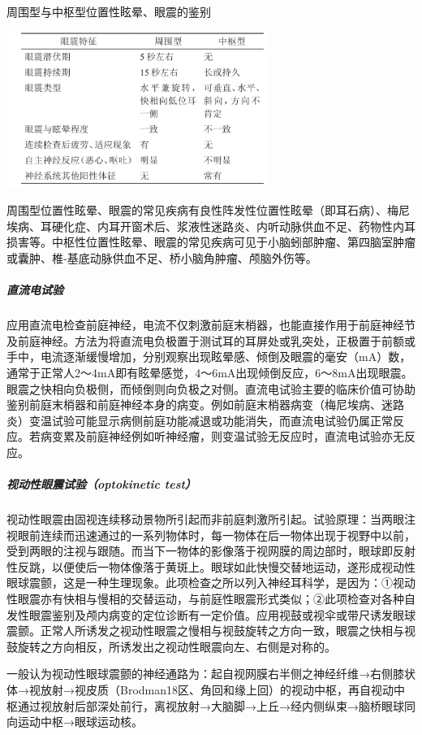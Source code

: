\begin{table}[htbp]
\centering
\caption{周围型与中枢型位置性眩晕、眼震的鉴别}
\label{tab3-1}
\includegraphics[width=3.36458in,height=2in]{./images/Image00008.jpg}
\end{table}

周围型位置性眩晕、眼震的常见疾病有良性阵发性位置性眩晕（即耳石病）、梅尼埃病、耳硬化症、内耳开窗术后、浆液性迷路炎、内听动脉供血不足、药物性内耳损害等。中枢性位置性眩晕、眼震的常见疾病可见于小脑蚓部肿瘤、第四脑室肿瘤或囊肿、椎-基底动脉供血不足、桥小脑角肿瘤、颅脑外伤等。

\subparagraph{直流电试验}

应用直流电检查前庭神经，电流不仅刺激前庭末梢器，也能直接作用于前庭神经节及前庭神经。方法为将直流电负极置于测试耳的耳屏处或乳突处，正极置于前额或手中，电流逐渐缓慢增加，分别观察出现眩晕感、倾倒及眼震的毫安（mA）数，通常于正常人2～4mA即有眩晕感觉，4～6mA出现倾倒反应，6～8mA出现眼震。眼震之快相向负极侧，而倾倒则向负极之对侧。直流电试验主要的临床价值可协助鉴别前庭末梢器和前庭神经本身的病变。例如前庭末梢器病变（梅尼埃病、迷路炎）变温试验可能显示病侧前庭功能减退或功能消失，而直流电试验仍属正常反应。若病变累及前庭神经例如听神经瘤，则变温试验无反应时，直流电试验亦无反应。

\subparagraph{视动性眼震试验（optokinetic test）}

视动性眼震由固视连续移动景物所引起而非前庭刺激所引起。试验原理：当两眼注视眼前连续而迅速通过的一系列物体时，每一物体在后一物体出现于视野中以前，受到两眼的注视与跟随。而当下一物体的影像落于视网膜的周边部时，眼球即反射性反跳，以便使后一物体像落于黄斑上。眼球如此快慢交替地运动，遂形成视动性眼球震颤，这是一种生理现象。此项检查之所以列入神经耳科学，是因为：①视动性眼震亦有快相与慢相的交替运动，与前庭性眼震形式类似；②此项检查对各种自发性眼震鉴别及颅内病变的定位诊断有一定价值。应用视鼓或视伞或带尺诱发眼球震颤。正常人所诱发之视动性眼震之慢相与视鼓旋转之方向一致，眼震之快相与视鼓旋转之方向相反，所诱发出之视动性眼震向左、右侧是对称的。

一般认为视动性眼球震颤的神经通路为：起自视网膜右半侧之神经纤维→右侧膝状体→视放射→视皮质（Brodman18区、角回和缘上回）的视动中枢，再自视动中枢通过视放射后部深处前行，离视放射→大脑脚→上丘→经内侧纵束→脑桥眼球同向运动中枢→眼球运动核。

